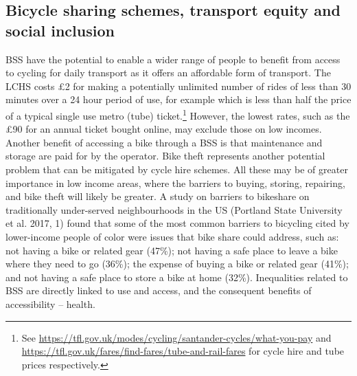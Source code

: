 \documentclass[]{article}
\begin{document}
\hypertarget{bicycle-sharing-schemes-transport-equity-and-social-inclusion}{%
\subsection{Bicycle sharing schemes, transport equity and social inclusion}\label{bicycle-sharing-schemes-transport-equity-and-social-inclusion}}

BSS have the potential to enable a wider range of people to benefit from access to cycling for daily transport as it offers an affordable form of transport.
The LCHS costs £2 for making a potentially unlimited number of rides of less than 30 minutes over a 24 hour period of use, for example which is less than half the price of a typical single use metro (tube) ticket.\footnote{See \url{https://tfl.gov.uk/modes/cycling/santander-cycles/what-you-pay} and \url{https://tfl.gov.uk/fares/find-fares/tube-and-rail-fares} for cycle hire and tube prices respectively.}
However, the lowest rates, such as the £90 for an annual ticket bought online, may exclude those on low incomes.
Another benefit of accessing a bike through a BSS is that maintenance and storage are paid for by the operator. Bike theft represents another potential problem that can be mitigated by cycle hire schemes.
All these may be of greater importance in low income areas, where the barriers to buying, storing, repairing, and bike theft will likely be greater.
A study on barriers to bikeshare on traditionally under-served neighbourhoods in the US (Portland State University et al. 2017, 1) found that some of the most common barriers to bicycling cited by lower-income people of color were issues that bike share could address, such as: not having a bike or related gear (47\%); not having a safe place to leave a bike where they need to go (36\%); the expense of buying a bike or related gear (41\%); and not having a safe place to store a bike at home (32\%).
Inequalities related to BSS are directly linked to use and access, and the consequent benefits of accessibility -- health.
\end{document}
